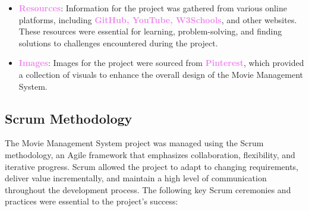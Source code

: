 \documentclass[a4paper,12pt]{article}  %
\renewcommand{\textbf}[1]{\textcolor{violet}{\bfseries #1}}
\begin{document}
\begin{itemize}
    \item \textbf{Resources}: Information for the project was gathered from various online platforms, including \textbf{GitHub, YouTube, W3Schools}, and other websites. These resources were essential for learning, problem-solving, and finding solutions to challenges encountered during the project.
    
    \item \textbf{Images}: Images for the project were sourced from \textbf{Pinterest}, which provided a collection of visuals to enhance the overall design of the Movie Management System.
\end{itemize}


\subsection{Scrum Methodology}
The Movie Management System project was managed using the Scrum methodology, an Agile framework that emphasizes collaboration, flexibility, and iterative progress. Scrum allowed the project to adapt to changing requirements, deliver value incrementally, and maintain a high level of communication throughout the development process. The following key Scrum ceremonies and practices were essential to the project’s success:
\end{document}
